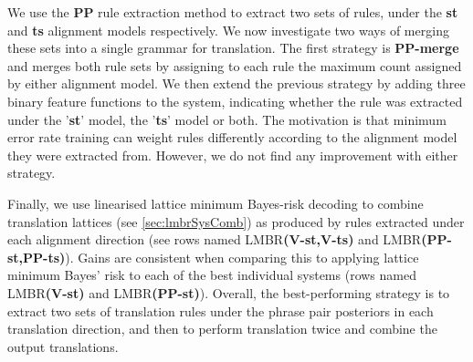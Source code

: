 We use the {\bf PP} rule extraction method to extract two sets of rules, under
the {\bf st} and {\bf ts} alignment models respectively. We now investigate two
ways of merging these sets into a single grammar for translation. The first
strategy is {\bf PP-merge} and merges both rule sets by assigning to each rule
the maximum count assigned by either alignment model. We then extend the
previous strategy by adding three binary feature functions to the system,
indicating whether the rule was extracted under the '{\bf st}' model, the
'{\bf ts}' model or both. The motivation is that minimum error rate training can
weight rules differently according to the alignment model they were extracted
from. However, we do not find any improvement with either strategy.

Finally, we use linearised lattice minimum Bayes-risk
decoding
to combine translation
lattices (see \autoref{sec:lmbrSysComb}) as produced by
rules extracted under each alignment direction (see rows named
LMBR{\bf(V-st,V-ts)} and LMBR{\bf(PP-st,PP-ts)}). Gains are consistent when
comparing this to applying lattice minimum Bayes' risk to each of the best
individual systems (rows named LMBR{\bf(V-st)} and LMBR{\bf(PP-st)}). Overall,
the best-performing strategy is to extract two sets of translation rules under
the phrase pair posteriors in each translation direction, and then to perform
translation twice and combine the output translations.

